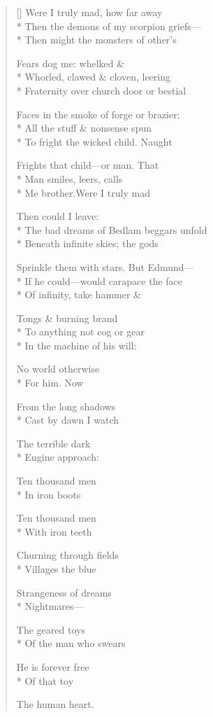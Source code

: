 \label{ch:lear_ap}
\settowidth{\versewidth}{Sprinkle them with stars.   But Edmund---}
\begin{verse}[\versewidth]
 Were I truly mad, how far away\\*
Then the demons of my scorpion griefs---\\*
Then might the monsters of other's

Fears dog me: whelked \&\\*
Whorled, clawed \& cloven, leering\\*
Fraternity over church door or bestial

Faces in the smoke of forge or brazier:\\*
All the stuff \& nonsense spun\\*
To fright the wicked child.   Naught

Frights that child---or man.   That\\*
Man smiles, leers, calls\\*
Me brother.\qquad Were I truly mad

Then could I leave:\\*
The bad dreams of Bedlam beggars unfold\\*
Beneath infinite skies; the gods

Sprinkle them with stars.   But Edmund---\\*
If he could---would carapace the face\\*
Of infinity, take hammer \&

Tongs \& burning brand\\*
To anything not cog or gear\\*
In the machine of his will:

No world otherwise\\*
For him.\hspace*{3\vgap} Now

From the long shadows\\*
Cast by dawn I watch

The terrible dark\\*
Engine approach:

Ten thousand men\\*
In iron boots

Ten thousand men\\*
With iron teeth

Churning through fields\\*
Villages\hspace*{3\vgap} the blue

Strangeness of dreams\\*
Nightmares---

The geared toys\\*
Of the man who swears

He is forever free\\*
Of that toy

The human heart.
\end{verse}
